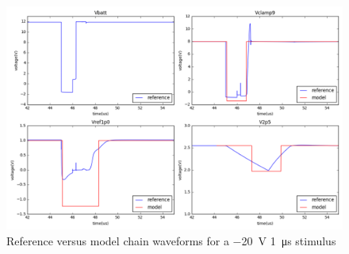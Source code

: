 \begin{figure}[!h]
  \centering
  \includegraphics[width=\textwidth]{src/4/figures/total_simulation_20V_1u_V2.png}
  \caption{Reference versus model chain waveforms for a \SI{-20}{\volt} \SI{1}{\micro\second} stimulus}
  \label{fig:reference_simu_v2_20V_1u}
\end{figure}

